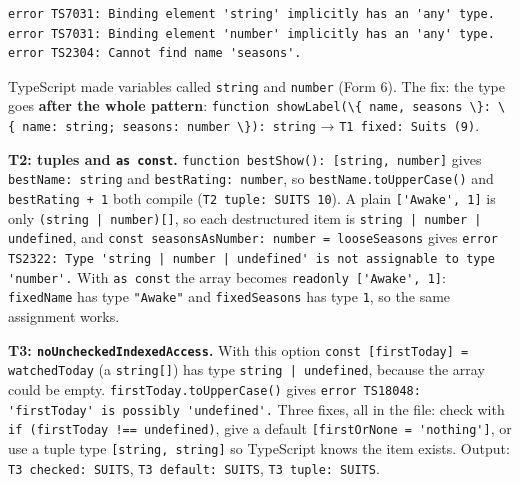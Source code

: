 \documentclass[
  10pt,
]{article}
\newcommand{\passthrough}[1]{#1}
\begin{document}
\begin{lstlisting}
error TS7031: Binding element 'string' implicitly has an 'any' type.
error TS7031: Binding element 'number' implicitly has an 'any' type.
error TS2304: Cannot find name 'seasons'.
\end{lstlisting}

TypeScript made variables called \passthrough{\lstinline!string!} and
\passthrough{\lstinline!number!} (Form 6). The fix: the type goes
\textbf{after the whole pattern}:
\passthrough{\lstinline!function showLabel(\{ name, seasons \}: \{ name: string; seasons: number \}): string!}
→ \passthrough{\lstinline!T1 fixed: Suits (9)!}.

\textbf{T2: tuples and \passthrough{\lstinline!as const!}.}
\passthrough{\lstinline!function bestShow(): [string, number]!} gives
\passthrough{\lstinline!bestName: string!} and
\passthrough{\lstinline!bestRating: number!}, so
\passthrough{\lstinline!bestName.toUpperCase()!} and
\passthrough{\lstinline!bestRating + 1!} both compile
(\passthrough{\lstinline!T2 tuple: SUITS 10!}). A plain
\passthrough{\lstinline!['Awake', 1]!} is only
\passthrough{\lstinline!(string | number)[]!}, so each destructured item
is \passthrough{\lstinline!string | number | undefined!}, and
\passthrough{\lstinline!const seasonsAsNumber: number = looseSeasons!}
gives
\passthrough{\lstinline!error TS2322: Type 'string | number | undefined' is not assignable to type 'number'.!}
With \passthrough{\lstinline!as const!} the array becomes
\passthrough{\lstinline!readonly ['Awake', 1]!}:
\passthrough{\lstinline!fixedName!} has type
\passthrough{\lstinline!"Awake"!} and
\passthrough{\lstinline!fixedSeasons!} has type
\passthrough{\lstinline!1!}, so the same assignment works.

\textbf{T3: \passthrough{\lstinline!noUncheckedIndexedAccess!}.} With
this option \passthrough{\lstinline!const [firstToday] = watchedToday!}
(a \passthrough{\lstinline!string[]!}) has type
\passthrough{\lstinline!string | undefined!}, because the array could be
empty. \passthrough{\lstinline!firstToday.toUpperCase()!} gives
\passthrough{\lstinline!error TS18048: 'firstToday' is possibly 'undefined'.!}
Three fixes, all in the file: check with
\passthrough{\lstinline"if (firstToday !== undefined)"}, give a default
\passthrough{\lstinline![firstOrNone = 'nothing']!}, or use a tuple type
\passthrough{\lstinline![string, string]!} so TypeScript knows the item
exists. Output: \passthrough{\lstinline!T3 checked: SUITS!},
\passthrough{\lstinline!T3 default: SUITS!},
\passthrough{\lstinline!T3 tuple: SUITS!}.
\end{document}
